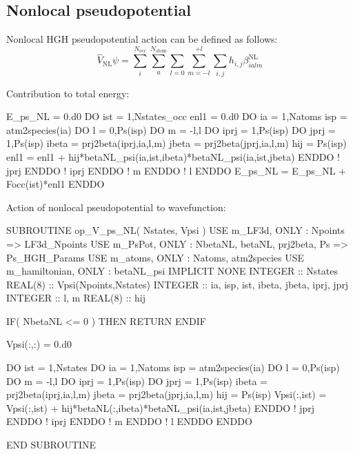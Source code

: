 \subsection{Nonlocal pseudopotential}

Nonlocal HGH pseudopotential action can be defined as follows:
\begin{equation}
\hat{V}_{\mathrm{NL}} \psi =
\sum_{i}^{N_{\mathrm{occ}}} \sum_{a}^{N_{\mathrm{atom}}}
\sum_{l=0}\sum_{m=-l}^{+l} \sum_{i,j}
h_{i,j} \beta^{\mathrm{NL}}_{ialm}
\end{equation}

Contribution to total energy:
\begin{fortrancode}
E_ps_NL = 0.d0
DO ist = 1,Nstates_occ
  enl1 = 0.d0
  DO ia = 1,Natoms
    isp = atm2species(ia)
    DO l = 0,Ps(isp)%
    DO m = -l,l
      DO iprj = 1,Ps(isp)%
      DO jprj = 1,Ps(isp)%
        ibeta = prj2beta(iprj,ia,l,m)
        jbeta = prj2beta(jprj,ia,l,m)
        hij = Ps(isp)%
        enl1 = enl1 + hij*betaNL_psi(ia,ist,ibeta)*betaNL_psi(ia,ist,jbeta)
      ENDDO ! jprj
      ENDDO ! iprj
    ENDDO ! m
    ENDDO ! l
  ENDDO 
  E_ps_NL = E_ps_NL + Focc(ist)*enl1
ENDDO 
\end{fortrancode}


Action of nonlocal pseudopotential to wavefunction:

\begin{fortrancode}
SUBROUTINE op_V_ps_NL( Nstates, Vpsi )
  USE m_LF3d, ONLY : Npoints => LF3d_Npoints
  USE m_PsPot, ONLY : NbetaNL, betaNL, prj2beta, Ps => Ps_HGH_Params
  USE m_atoms, ONLY : Natoms, atm2species
  USE m_hamiltonian, ONLY : betaNL_psi
  IMPLICIT NONE
  INTEGER :: Nstates
  REAL(8) :: Vpsi(Npoints,Nstates)
  INTEGER :: ia, isp, ist, ibeta, jbeta, iprj, jprj
  INTEGER :: l, m
  REAL(8) :: hij

  IF( NbetaNL <= 0 ) THEN
    RETURN
  ENDIF

  Vpsi(:,:) = 0.d0

  DO ist = 1,Nstates
    DO ia = 1,Natoms
      isp = atm2species(ia)
      DO l = 0,Ps(isp)%
      DO m = -l,l
        DO iprj = 1,Ps(isp)%
        DO jprj = 1,Ps(isp)%
          ibeta = prj2beta(iprj,ia,l,m)
          jbeta = prj2beta(jprj,ia,l,m)
          hij = Ps(isp)%
          Vpsi(:,ist) = Vpsi(:,ist) + hij*betaNL(:,ibeta)*betaNL_psi(ia,ist,jbeta)
        ENDDO ! jprj
        ENDDO ! iprj
      ENDDO ! m
      ENDDO ! l
    ENDDO
  ENDDO

END SUBROUTINE
\end{fortrancode}

